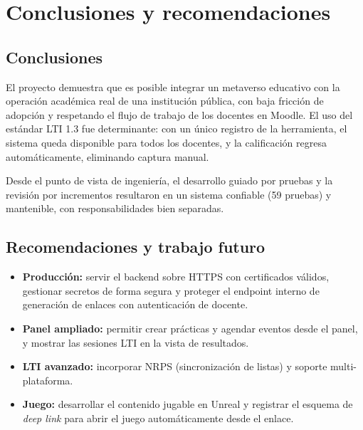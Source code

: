 \documentclass[12pt,letterpaper,oneside]{report}
\begin{document}
\chapter{Conclusiones y recomendaciones}

\section{Conclusiones}
El proyecto demuestra que es posible integrar un metaverso educativo con la
operación académica real de una institución pública, con baja fricción de
adopción y respetando el flujo de trabajo de los docentes en Moodle. El uso del
estándar LTI 1.3 fue determinante: con un único registro de la herramienta, el
sistema queda disponible para todos los docentes, y la calificación regresa
automáticamente, eliminando captura manual.

Desde el punto de vista de ingeniería, el desarrollo guiado por pruebas y la
revisión por incrementos resultaron en un sistema confiable (59 pruebas) y
mantenible, con responsabilidades bien separadas.

\section{Recomendaciones y trabajo futuro}
\begin{itemize}[leftmargin=1.4em]
  \item \textbf{Producción:} servir el backend sobre HTTPS con certificados
  válidos, gestionar secretos de forma segura y proteger el endpoint interno de
  generación de enlaces con autenticación de docente.
  \item \textbf{Panel ampliado:} permitir crear prácticas y agendar eventos desde
  el panel, y mostrar las sesiones LTI en la vista de resultados.
  \item \textbf{LTI avanzado:} incorporar NRPS (sincronización de listas) y
  soporte multi-plataforma.
  \item \textbf{Juego:} desarrollar el contenido jugable en Unreal y registrar el
  esquema de \emph{deep link} para abrir el juego automáticamente desde el enlace.
\end{itemize}

\end{document}
